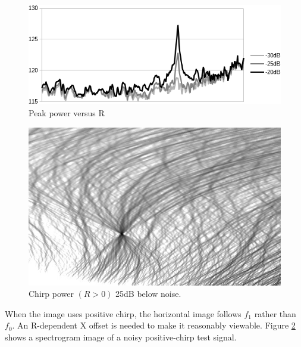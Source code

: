 \begin{figure}
  \includegraphics[width=\linewidth]{../source/Rpeaks.png}
  \caption{Peak power versus R}
  \label{fig:chirpRvalues1}
\end{figure}

\begin{figure}
  \includegraphics[width=\linewidth]{../source/chirp42p.jpg}
  \caption{Chirp power $(R>0)$ 25dB below noise.}
  \label{fig:chirpTest2}
\end{figure}

When the image uses positive chirp, the horizontal image follows $f_1$ rather 
than $f_0$. An R-dependent X offset is needed to make it reasonably viewable.
Figure \ref{fig:chirpTest2} shows a spectrogram image of a noisy positive-chirp
test signal.  

